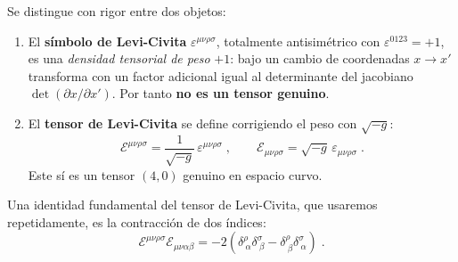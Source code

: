             \begin{myDef}\label{def:LC}
                Se distingue con rigor entre dos objetos:
                \begin{enumerate}
                    \item El \textbf{símbolo de Levi-Civita} $\varepsilon^{\mu\nu\rho\sigma}$,
                        totalmente antisimétrico con $\varepsilon^{0123}=+1$, es una \emph{densidad tensorial de peso} $+1$: bajo un cambio de coordenadas $x\to x'$ transforma con un factor adicional igual al determinante del jacobiano $\det(\partial x/\partial x')$.  Por tanto \textbf{no es un tensor genuino}.

                    \item El \textbf{tensor de Levi-Civita} se define corrigiendo el peso
                        con $\sqrt{-g}$:
                        \begin{equation}\label{eq:TensorLC}
                            \mathcal{E}^{\mu\nu\rho\sigma}
                                = \frac{1}{\sqrt{-g}}\,\varepsilon^{\mu\nu\rho\sigma}\;,
                            \qquad
                            \mathcal{E}_{\mu\nu\rho\sigma}
                                = \sqrt{-g}\,\varepsilon_{\mu\nu\rho\sigma}\;.
                        \end{equation}
                        Este sí es un tensor $(4,0)$ genuino en espacio curvo.
                \end{enumerate}
            \end{myDef}

            Una identidad fundamental del tensor de Levi-Civita, que usaremos repetidamente, es la contracción de dos índices:
            \begin{equation}\label{eq:ContrLC}
                \mathcal{E}^{\mu\nu\rho\sigma}\mathcal{E}_{\mu\nu\alpha\beta}
                = -2\!\left(\delta^{\rho}_{\ \alpha}\delta^{\sigma}_{\ \beta}
                        -\delta^{\rho}_{\ \beta}\delta^{\sigma}_{\ \alpha}\right)\;.
            \end{equation}

